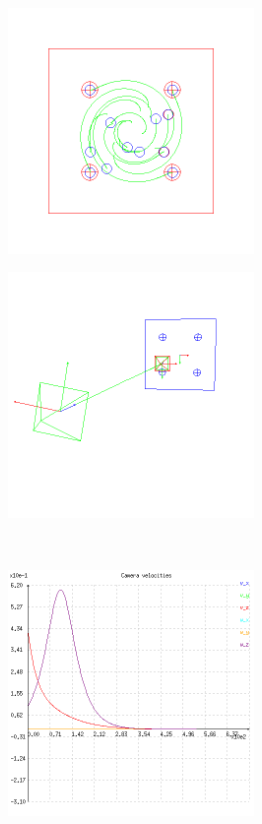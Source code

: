 \begin{figure}[ht!]
\centering
\begin{mdframed}[linecolor=black!30,backgroundcolor=black!5]
  \centering
  \begin{subfigure}{.48\textwidth}
    \centering
    \includegraphics[width=65mm]{figures/plots/ex4cimage.png}
    \caption{}
    \label{fig:ex4cimage}
  \end{subfigure}
  \begin{subfigure}{.48\textwidth}
    \centering
    \includegraphics[width=65mm]{figures/plots/ex4cscene.png}
    \caption{}
    \label{fig:ex4cscene}
  \end{subfigure}
  \\
  \begin{subfigure}{.48\textwidth}
    \centering
    \includegraphics[width=65mm]{figures/plots/ex4cvelocity.png}

\end{subfigure}
\end{mdframed}
\end{figure}
